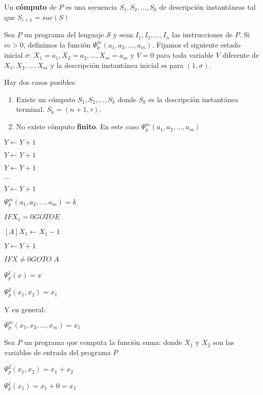 \begin{definition}
Un \textbf{c\'omputo} de $P$ es una secuencia $S_1, S_2, \ldots, S_k$ de descripci\'on instant\'aneas tal que $S_{i + 1} = suc(S)$
\end{definition}
 
\begin{definition}
Sea $P$ un programa del lenguaje $\mathcal{S}$ y sean $I_1, I_2, \ldots, I_n$ las instrucciones de $P$. Si $m > 0$, definimos la funci\'on $\varPsi_{p}^{m}(a_1, a_2, \ldots, a_m)$. Fijamos el siguiente estado inicial $\sigma$: $X_1 = a_1, X_2 = a_2, \ldots, X_m = a_m$ y $V = 0$ para toda variable $V$ diferente de $X_1, X_2, \ldots, X_m$ y la descripci\'on instant\'anea inicial es para $(1, \sigma)$.
 
Hay dos casos posibles:
	\begin{enumerate}
		\item Existe un c\'omputo $S_{1}, S_{2}, \ldots, S_{k}$ donde $S_{k}$ es la descripci\'on instant\'anea terminal. $S_{k} = (n + 1, \tau)$.
		\item No existe c\'omputo \textbf{finito}. En este caso $\varPsi_{p}^{m}(a_1, a_2, \ldots, a_m)$
	\end{enumerate}
\end{definition}
 
\begin{example}
$Y \leftarrow Y + 1$
 
$Y \leftarrow Y + 1$
 
$Y \leftarrow Y + 1$
 
$\ldots$
 
$Y \leftarrow Y + 1$
 
$\varPsi_{p}^{m}(a_1, a_2, \ldots, a_m) = k$
\end{example}
 
\begin{example}
$IF X_1 = 0 GOTO E$
 
$[A] X_1 \leftarrow X_1 - 1$
 
$Y \leftarrow Y + 1$
 
$IF X \neq 0 GOTO \; A$
 
$\varPsi_{p}^{1}(x) = x$
 
$\varPsi_{p}^{2}(x_1, x_2) = x_1$
 
Y en general:
 
$\varPsi_{p}^{m}(x_1, x_2, \ldots, x_m) = x_1$
\end{example}
 
\begin{example}
Sea $P$ un programa que computa la funci\'on suma: donde $X_1$ y $X_2$ son las variables de entrada del programa $P$
 
$\varPsi_{p}^{2}(x_1, x_2) = x_1 + x_2$
 
$\varPsi_{p}^{1}(x_1) = x_1 + 0 = x_1$
 
\end{example}
 
